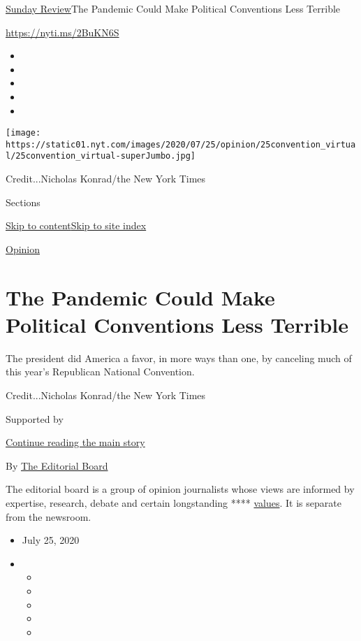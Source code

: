 \href{/section/opinion/sunday}{Sunday Review}\textbar{}The Pandemic
Could Make Political Conventions Less Terrible

\url{https://nyti.ms/2BuKN6S}

\begin{itemize}
\item
\item
\item
\item
\item
\end{itemize}

\texttt{[image: https://static01.nyt.com/images/2020/07/25/opinion/25convention\_virtual/25convention\_virtual-superJumbo.jpg]}

Credit...Nicholas Konrad/the New York Times

Sections

\protect\hyperlink{site-content}{Skip to
content}\protect\hyperlink{site-index}{Skip to site index}

\href{/section/opinion}{Opinion}

\hypertarget{the-pandemic-could-make-political-conventions-less-terrible}{%
\section{The Pandemic Could Make Political Conventions Less
Terrible}\label{the-pandemic-could-make-political-conventions-less-terrible}}

The president did America a favor, in more ways than one, by canceling
much of this year's Republican National Convention.

Credit...Nicholas Konrad/the New York Times

Supported by

\protect\hyperlink{after-sponsor}{Continue reading the main story}

By
\href{https://www.nytimes.com/interactive/opinion/editorialboard.html}{The
Editorial Board}

The editorial board is a group of opinion journalists whose views are
informed by expertise, research, debate and certain longstanding ****
\href{https://www.nytimes.com/interactive/2018/opinion/editorialboard.html?module=inline}{values}.
It is separate from the newsroom.

\begin{itemize}
\item
  July 25, 2020
\item
  \begin{itemize}
  \item
  \item
  \item
  \item
  \item
  \end{itemize}
\end{itemize}

